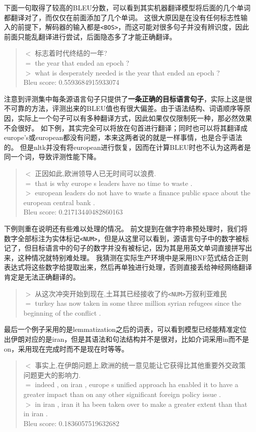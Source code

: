 \documentclass[logo,reportComp]{thesis}
\let\emph\relax %
\begin{document}
下面一句取得了较高的BLEU分数，可以看到其实机器翻译模型将后面的几个单词都翻译对了，而仅仅在前面添加了几个单词。
这很大原因是在没有任何标志性输入的前提下，解码器的输入都是\verb'<BOS>'，而这可能对很多句子并没有辨识度，因此前面只能乱翻译进行尝试，后面隐态多了才能正确翻译。
\begin{quote}
$<$ 标志着时代终结的一年?\\
$=$ the year that ended an epoch ?\\
$>$ what is desperately needed is the year that ended an epoch ?\\
Bleu score: 0.5593684915933074
\end{quote}

注意到评测集中每条源语言句子只提供了\textbf{一条正确的目标语言句子}，实际上这是很不可靠的方法，评测出来的BLEU值也有很大偏差。由于语法结构、词语顺序等原因，实际上一个句子可以有多种翻译方式，因此如果仅仅限制死一种，那必然效果不会很好。
如下例，其实完全可以将\emph{欧洲领导人}放在句首进行翻译；同时也可以将其翻译成europe's或european都没有问题，本来这两者说的就是一样事情，也是合乎语法的。
但是nltk并没有将european进行恢复，因而在计算BLEU时也不认为这两者是同一个词，导致评测性能下降。
\begin{quote}
$<$ 正因如此,欧洲领导人已无时间可以浪费.\\
$=$ that is why europe s leaders have no time to waste .\\
$>$ european leaders do not have to waste a finance public space about the european central bank .\\
Bleu score: 0.21713440482860163
\end{quote}

下例则重在说明还有些难以处理的情况。
前文提到在做字符串预处理时，我们将数字全部标注为实体标记\verb'<NUM>'，但是从这里可以看到，源语言句子中的数字被标记了，但目标语言中的句子的数字并没有被标记，因为其是用英文单词直接拼写出来，这种情况就特别难处理。
我猜测在实际生产环境中是采用BNF范式结合正则表达式将这些数字给提取出来，然后再单独进行处理，否则直接丢给神经网络翻译肯定是无法正确翻译的。
\begin{quote}
$>$ 从这次冲突开始到现在,土耳其已经接收了约\verb'<NUM>'万叙利亚难民\\
$=$ turkey has now taken in some three million syrian refugees since the beginning of the conflict .
\end{quote}

最后一个例子采用的是lemmatization之后的词表，可以看到模型已经能精准定位出伊朗对应的是iran，但是其语法和句法结构并不是很对，比如介词采用in而不是on，采用现在完成时而不是现在时等等。
\begin{quote}
$<$ 事实上,在伊朗问题上,欧洲的统一意见能让它获得比其他重要外交政策问题更大的影响力.\\
$=$ indeed , on iran , europe s unified approach ha enabled it to have a greater impact than on any other significant foreign policy issue .\\
$>$ in iran , iran it ha been taken over to make a greater extent than that in iran .\\
Bleu score: 0.1836057519632682
\end{quote}
\end{document}
